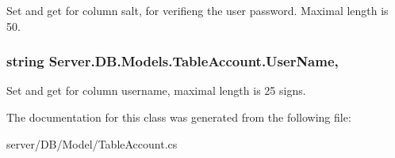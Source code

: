 Set and get for column salt, for verifieng the user password. Maximal length is 50. 

\hypertarget{classServer_1_1DB_1_1Models_1_1TableAccount_ad35a3a996444afd590e747e4e4064100}{
\subsubsection[{User\-Name}]{\setlength{\rightskip}{0pt plus 5cm}string Server.\-D\-B.\-Models.\-Table\-Account.\-User\-Name\hspace{0.3cm}{\ttfamily [get]}, {\ttfamily [set]}}}\label{classServer_1_1DB_1_1Models_1_1TableAccount_ad35a3a996444afd590e747e4e4064100}


Set and get for column username, maximal length is 25 signs. 



The documentation for this class was generated from the following file\-:\begin{DoxyCompactItemize}
\item 
server/\-D\-B/\-Model/Table\-Account.\-cs\end{DoxyCompactItemize}

